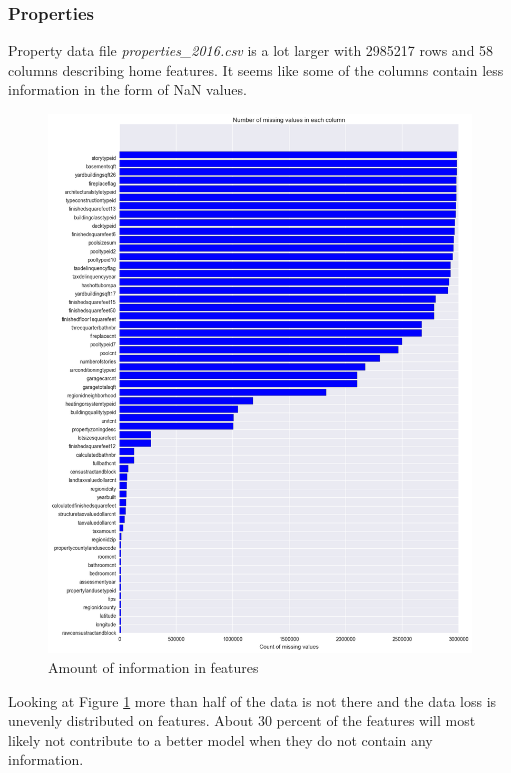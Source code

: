 \documentclass[a4paper]{article}
\begin{document}
\subsubsection{Properties}
Property data file \textit{properties\_2016.csv} is a lot larger with 2985217 rows and 58 columns describing home features. It seems like some of the columns contain less information in the form of NaN values.
\begin{figure}
\centering
\includegraphics[width=1\textwidth]{./img/prop-nan.png}
\caption{\label{fig:prop-nan} Amount of information in features}
\end{figure}
Looking at Figure \ref{fig:prop-nan} more than half of the data is not there and the data loss is unevenly distributed on features. About 30 percent of the features will most likely not contribute to a better model when they do not contain any information.
\end{document}
